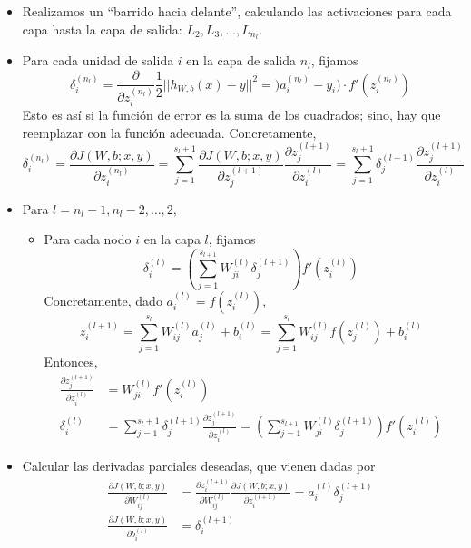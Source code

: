 \begin{itemize}
\item Realizamos un ``barrido hacia delante'', calculando las activaciones para cada capa hasta la capa de salida: $L_2, L_3, \dots, L_{n_l}$.
\item Para cada unidad de salida $i$ en la capa de salida $n_l$, fijamos
\begin{equation}
\delta^{(n_l)}_i = \frac{\partial}{\partial z^{(n_l)}_i} \frac{1}{2} ||h_{W,b}(x) - y||^2 = )a^{(n_l)}_i - y_i) \cdot f'(z^{(n_l)}_i)
\end{equation}
Esto es así si la función de error es la suma de los cuadrados; sino, hay que reemplazar con la función adecuada. Concretamente, 
\begin{equation}
\delta^{(n_l)}_i = \frac{\partial J(W, b; x, y)}{\partial z^{(n_l)}_i} = \sum_{j = 1}^{s_l + 1} \frac{\partial J(W, b; x, y)}{\partial z_j^{(l+1)}} \frac{\partial z_j^{(l+1)}}{\partial z_i^{(l)}} = \sum_{j = 1}^{s_l + 1} \delta^{(l + 1)}_j \frac{\partial z_j^{(l+1)}}{\partial z_i^{(l)}}
\end{equation}
\item Para $l = n_l - 1, n_l - 2, \dots, 2$,
\begin{itemize}
\item Para cada nodo $i$ en la capa $l$, fijamos
\begin{equation}
\delta^{(l)}_i = \left(\sum_{j = 1}^{s_{l+1}} W_{ji}^{(l)} \delta^{(l+1)}_j\right) f'(z^{(l)}_i)
\end{equation}
Concretamente, dado $a_i^{(l)} = f(z_i^{(l)})$,
\begin{equation}
z_i^{(l+1)} = \sum_{j = 1}^{s_l} W_{ij}^{(l)} a_j^{(l)} + b_i^{(l)} = \sum_{j = 1}^{s_l} W_{ij}^{(l)} f(z_j^{(l)}) + b_i^{(l)}
\end{equation}
Entonces,
\begin{align}
\frac{\partial z_j^{(l+1)}}{\partial z_i^{(l)}} &= W_{ji}^{(l)} f'(z_i^{(l)}) \\
\delta_i^{(l)} &= \sum_{j = 1}^{s_l + 1} \delta_j^{(l+1)} \frac{\partial z_j^{(l+1)}}{\partial z_i^{(l)}} = \left(\sum_{j = 1}^{s_{l+1}} W_{ji}^{(l)} \delta_j^{(l+1)}\right) f'(z_i^{(l)})
\end{align}
\end{itemize}
\item Calcular las derivadas parciales deseadas, que vienen dadas por 
\begin{align}
\frac{\partial J(W,b;x,y)}{\partial W^{(l)}_{ij}} &= \frac{\partial z_i^{(l+1)}}{\partial W_{ij}^{(l)}}\frac{\partial J(W, b; x, y)}{\partial z_i^{(l + 1)}} = a^{(l)}_i \delta^{(l+1)}_j \\
\frac{\partial J(W,b;x,y)}{\partial b^{(l)}_i} &= \delta^{(l+1)}_i
\end{align}
\end{itemize}

